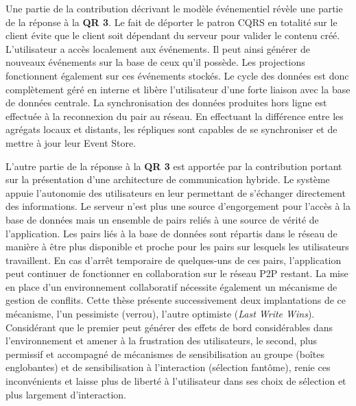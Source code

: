 Une partie de la contribution décrivant le modèle événementiel révèle une partie de 
la réponse à la \textbf{QR 3}.
Le fait de déporter le patron \gls{CQRS} en totalité sur le client évite que le client 
soit dépendant du serveur pour valider le contenu créé. L'utilisateur a accès 
localement aux événements. Il peut ainsi générer de nouveaux événements sur la 
base de ceux qu'il possède. Les projections fonctionnent également sur ces 
événements stockés. Le cycle des données est donc complètement géré en 
interne et libère l'utilisateur d'une forte liaison avec la base de données centrale. 
La synchronisation des données produites hors ligne est effectuée à la 
reconnexion du pair au réseau. En effectuant la différence entre les agrégats 
locaux et distants, les répliques sont capables de se synchroniser et de mettre à 
jour leur Event Store. 

L'autre partie de la réponse à la \textbf{QR 3} est apportée par la contribution 
portant sur la présentation d'une architecture de communication hybride. Le 
système appuie l'autonomie des utilisateurs en leur permettant de s'échanger 
directement des 
informations. Le serveur n'est plus une source d'engorgement pour l'accès à la 
base de données mais un ensemble de pairs reliés à une source de vérité de 
l'application. Les pairs liés à la base de données sont répartis dans le réseau de 
manière à être plus disponible et proche pour les pairs sur lesquels les utilisateurs 
travaillent. En cas d'arrêt temporaire de quelques-uns de ces pairs, l'application 
peut continuer de fonctionner en collaboration sur le réseau \gls{P2P} restant. 
La mise en place d'un environnement collaboratif nécessite également un 
mécanisme de gestion de conflits. Cette thèse présente successivement deux 
implantations de ce mécanisme, l'un pessimiste (verrou), l'autre optimiste 
(\textit{Last Write Wins}). 
Considérant que le premier peut générer des effets de bord considérables dans 
l'environnement et amener à la frustration des utilisateurs, le second, plus 
permissif et accompagné de mécanismes de sensibilisation au groupe (boîtes 
englobantes) et de sensibilisation à l'interaction (sélection fantôme), 
renie ces inconvénients et laisse plus de liberté à l'utilisateur dans ses choix de 
sélection et plus largement d'interaction.
%

